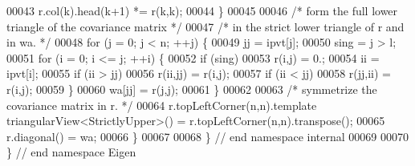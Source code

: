 \begin{DoxyCode}
00043         r.col(k).head(k+1) *= r(k,k);
00044     \}
00045 
00046     \textcolor{comment}{/* form the full lower triangle of the covariance matrix */}
00047     \textcolor{comment}{/* in the strict lower triangle of r and in wa. */}
00048     \textcolor{keywordflow}{for} (j = 0; j < n; ++j) \{
00049         jj = ipvt[j];
00050         sing = j > l;
00051         \textcolor{keywordflow}{for} (i = 0; i <= j; ++i) \{
00052             \textcolor{keywordflow}{if} (sing)
00053                 r(i,j) = 0.;
00054             ii = ipvt[i];
00055             \textcolor{keywordflow}{if} (ii > jj)
00056                 r(ii,jj) = r(i,j);
00057             \textcolor{keywordflow}{if} (ii < jj)
00058                 r(jj,ii) = r(i,j);
00059         \}
00060         wa[jj] = r(j,j);
00061     \}
00062 
00063     \textcolor{comment}{/* symmetrize the covariance matrix in r. */}
00064     r.topLeftCorner(n,n).template triangularView<StrictlyUpper>() = r.topLeftCorner(n,n).transpose();
00065     r.diagonal() = wa;
00066 \}
00067 
00068 \} \textcolor{comment}{// end namespace internal}
00069 
00070 \} \textcolor{comment}{// end namespace Eigen}
\end{DoxyCode}

